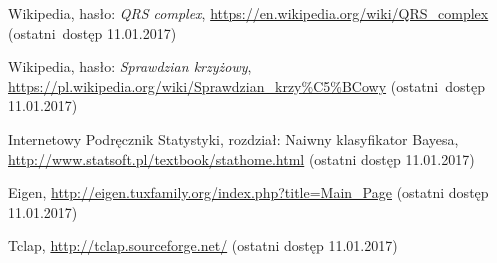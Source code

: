 \documentclass[12pt]{article}
\begin{document}
 








\begin{thebibliography}{5}
	Wikipedia, hasło: \textit{QRS complex},
	\url{https://en.wikipedia.org/wiki/QRS_complex}
	(ostatni~dostęp 11.01.2017)

	Wikipedia, hasło: \textit{Sprawdzian krzyżowy},
	\url{https://pl.wikipedia.org/wiki/Sprawdzian_krzy%C5%BCowy}
	(ostatni~dostęp 11.01.2017)
	
	Internetowy Podręcznik Statystyki, rozdział: Naiwny klasyfikator Bayesa,
	\url{http://www.statsoft.pl/textbook/stathome.html}
	(ostatni dostęp 11.01.2017)
	
	Eigen, 
	\url{http://eigen.tuxfamily.org/index.php?title=Main_Page}
	(ostatni dostęp 11.01.2017)

	Tclap, 
	\url{http://tclap.sourceforge.net/}
	(ostatni dostęp 11.01.2017)

\end{thebibliography}
\end{document}
